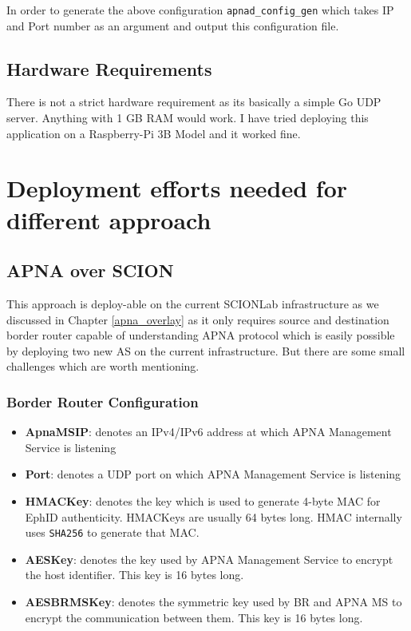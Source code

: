 In order to generate the above configuration \texttt{apnad\_config\_gen} which takes IP and Port number as an argument and output this configuration file.

\subsection{Hardware Requirements}
There is not a strict hardware requirement as its basically a simple Go UDP server. Anything with 1 GB RAM would work. I have tried deploying this application on a Raspberry-Pi 3B Model and it worked fine.

\section{Deployment efforts needed for different approach}

\subsection{APNA over SCION}
This approach is deploy-able on the current SCIONLab infrastructure as we discussed in Chapter \ref{apna_overlay} as it only requires source and destination border router capable of understanding APNA protocol which is easily possible by deploying two new AS on the current infrastructure. But there are some small challenges which are worth mentioning.

\subsubsection{Border Router Configuration} \label{config:border_router}
\begin{itemize}
    \item \textbf{ApnaMSIP}: denotes an IPv4/IPv6 address at which APNA Management Service is listening
    \item \textbf{Port}: denotes a UDP port on which APNA Management Service is listening
    \item \textbf{HMACKey}: denotes the key which is used to generate 4-byte MAC for EphID authenticity. HMACKeys are usually 64 bytes long. HMAC internally uses \texttt{SHA256} to generate that MAC.
    \item \textbf{AESKey}: denotes the key used by APNA Management Service to encrypt the host identifier. This key is 16 bytes long.
    \item \textbf{AESBRMSKey}: denotes the symmetric key used by BR and APNA MS to encrypt the communication between them. This key is 16 bytes long.
\end{itemize}
\inputminted[frame=lines, framesep=2mm, baselinestretch=1.2, fontsize=\footnotesize, breaklines]{json}{code_snippets/border_router.json}

